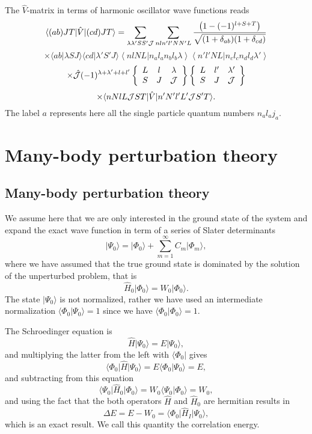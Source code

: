 \documentclass[graybox,sectrefs,envcountresetchap,open=right]{svmonodo}
\begin{document}
The $\hat{V}$-matrix in terms of harmonic oscillator wave functions reads
\[
  \langle (ab)JT|\hat{V}|(cd)JT\rangle=
  {\displaystyle \sum_{\lambda \lambda ' SS' {\cal J}}\sum_{nln'l'NN'L}
  \frac{\left(1-(-1)^{l+S+T}\right)}{\sqrt{(1+\delta_{ab})
  (1+\delta_{cd})}}}
\]
\[
  \times\langle ab|\lambda SJ\rangle \langle cd|\lambda 'S'J\rangle
  \left\langle nlNL| n_{a}l_{a}n_{b}l_{b}\lambda\right\rangle
  \left\langle n'l'NL| n_{c}l_{c}n_{d}l_{d}\lambda ' \right\rangle
\]
\[
 \times \hat{{\cal J}}(-1)^{\lambda + \lambda ' +l +l'}
  \left\{\begin{array}{ccc}L&l&\lambda\\S&J&{\cal J}
  \end{array}\right\}
  \left\{\begin{array}{ccc}L&l'&\lambda '\\S&J&{\cal J}
  \end{array}\right\}
\]
\[
 \times\langle nNlL{\cal J}ST\vert\hat{V}\vert n'N'l'L'{\cal J}S'T\rangle.
\]
The label $a$ represents here all the single particle quantum numbers  
$n_{a}l_{a}j_{a}$.



\chapter{Many-body perturbation theory}
\label{ch:mbpt}

\section{Many-body perturbation theory}

We assume here that we are only interested in the ground state of the system and 
expand the exact wave function in term of a series of Slater determinants
\[
\vert \Psi_0\rangle = \vert \Phi_0\rangle + \sum_{m=1}^{\infty}C_m\vert \Phi_m\rangle,
\]
where we have assumed that the true ground state is dominated by the 
solution of the unperturbed problem, that is
\[
\hat{H}_0\vert \Phi_0\rangle= W_0\vert \Phi_0\rangle.
\]
The state $\vert \Psi_0\rangle$ is not normalized, rather we have used an intermediate 
normalization $\langle \Phi_0 \vert \Psi_0\rangle=1$ since we have $\langle \Phi_0\vert \Phi_0\rangle=1$. 



The Schroedinger equation is
\[
\hat{H}\vert \Psi_0\rangle = E\vert \Psi_0\rangle,
\]
and multiplying the latter from the left with $\langle \Phi_0\vert $ gives
\[
\langle \Phi_0\vert \hat{H}\vert \Psi_0\rangle = E\langle \Phi_0\vert \Psi_0\rangle=E,
\]
and subtracting from this equation
\[
\langle \Psi_0\vert \hat{H}_0\vert \Phi_0\rangle= W_0\langle \Psi_0\vert \Phi_0\rangle=W_0,
\]
and using the fact that the both operators $\hat{H}$ and $\hat{H}_0$ are hermitian 
results in
\[
\Delta E=E-W_0=\langle \Phi_0\vert \hat{H}_I\vert \Psi_0\rangle,
\]
which is an exact result. We call this quantity the correlation energy.
\end{document}
